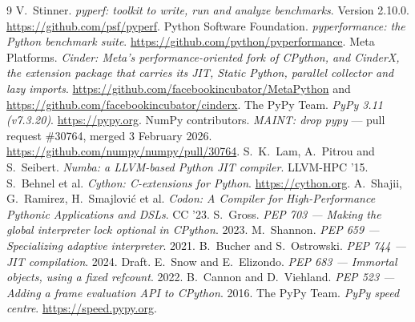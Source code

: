 \documentclass[10pt,a4paper]{article}
\begin{document}
\begin{thebibliography}{9}
\small
{} V.~Stinner. \emph{pyperf: toolkit to write, run and analyze benchmarks}.
  Version 2.10.0. \url{https://github.com/psf/pyperf}.
 Python Software Foundation. \emph{pyperformance: the Python
  benchmark suite}. \url{https://github.com/python/pyperformance}.
 Meta Platforms. \emph{Cinder: Meta's performance-oriented fork of CPython,
  and CinderX, the extension package that carries its JIT, Static Python, parallel collector
  and lazy imports}. \url{https://github.com/facebookincubator/MetaPython} and
  \url{https://github.com/facebookincubator/cinderx}.
 The PyPy Team. \emph{PyPy 3.11 (v7.3.20)}. \url{https://pypy.org}.
 NumPy contributors. \emph{MAINT: drop pypy} --- pull request \#30764,
  merged 3 February 2026. \url{https://github.com/numpy/numpy/pull/30764}.
 S.~K.~Lam, A.~Pitrou and S.~Seibert. \emph{Numba: a LLVM-based Python JIT
  compiler}. LLVM-HPC '15.
 S.~Behnel et al. \emph{Cython: C-extensions for Python}.
  \url{https://cython.org}.
 A.~Shajii, G.~Ramirez, H.~Smajlovi\'c et al. \emph{Codon: A Compiler for
  High-Performance Pythonic Applications and DSLs}. CC '23.
 S.~Gross. \emph{PEP 703 --- Making the global interpreter lock optional
  in CPython}. 2023.
 M.~Shannon. \emph{PEP 659 --- Specializing adaptive interpreter}. 2021.
 B.~Bucher and S.~Ostrowski. \emph{PEP 744 --- JIT compilation}. 2024.
  Draft.
 E.~Snow and E.~Elizondo. \emph{PEP 683 --- Immortal objects, using a
  fixed refcount}. 2022.
 B.~Cannon and D.~Viehland. \emph{PEP 523 --- Adding a frame
  evaluation API to CPython}. 2016.
 The PyPy Team. \emph{PyPy speed centre}. \url{https://speed.pypy.org}.
\end{thebibliography}
\end{document}
